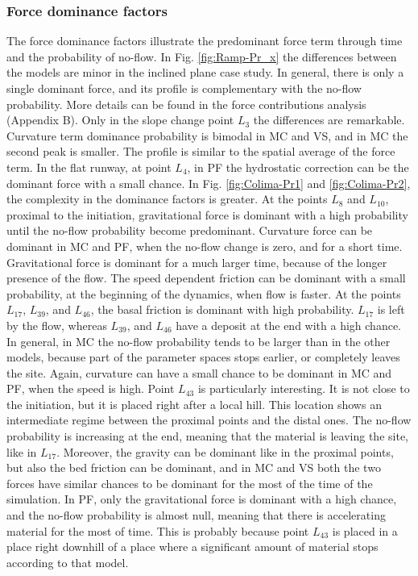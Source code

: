 \documentclass{article}
\begin{document}
\subsubsection{Force dominance factors}
The force dominance factors illustrate the predominant force term through time and the probability of no-flow. In Fig. \ref{fig:Ramp-Pr_x} the differences between the models are minor in the inclined plane case study. In general, there is only a single dominant force, and its profile is complementary with the no-flow probability. More details can be found in the force contributions analysis (Appendix B). Only in the slope change point $L_3$ the differences are remarkable. Curvature term dominance probability is bimodal in MC and VS, and in MC the second peak is smaller. The profile is similar to the spatial average of the force term. In the flat runway, at point $L_4$, in PF the hydrostatic correction can be the dominant force with a small chance. In Fig. \ref{fig:Colima-Pr1} and \ref{fig:Colima-Pr2}, the complexity in the dominance factors is greater. At the points $L_8$ and $L_{10}$, proximal to the initiation, gravitational force is dominant with a high probability until the no-flow probability become predominant. Curvature force can be dominant in MC and PF, when the no-flow change is zero, and for a short time. Gravitational force is dominant for a much larger time, because of the longer presence of the flow. The speed dependent friction can be dominant with a small probability, at the beginning of the dynamics, when flow is faster. At the points $L_{17}$, $L_{39}$, and $L_{46}$, the basal friction is dominant with high probability. $L_{17}$ is left by the flow, whereas $L_{39}$, and $L_{46}$ have a deposit at the end with a high chance. In general, in MC the no-flow probability tends to be larger than in the other models, because part of the parameter spaces stops earlier, or completely leaves the site. Again, curvature can have a small chance to be dominant in MC and PF, when the speed is high. Point $L_{43}$ is particularly interesting. It is not close to the initiation, but it is placed right after a local hill. This location shows an intermediate regime between the proximal points and the distal ones. The no-flow probability is increasing at the end, meaning that the material is leaving the site, like in $L_{17}$. Moreover, the gravity can be dominant like in the proximal points, but also the bed friction can be dominant, and in MC and VS both the two forces have similar chances to be dominant for the most of the time of the simulation. In PF, only the gravitational force is dominant with a high chance, and the no-flow probability is almost null, meaning that there is accelerating material for the most of time. This is probably because point $L_{43}$ is placed in a place right downhill of a place where a significant amount of material stops according to that model.
\end{document}
